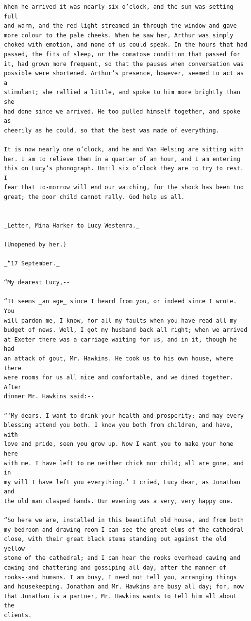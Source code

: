 \documentclass{article}
\begin{document}
\begin{verbatim}
When he arrived it was nearly six o’clock, and the sun was setting full
and warm, and the red light streamed in through the window and gave
more colour to the pale cheeks. When he saw her, Arthur was simply
choked with emotion, and none of us could speak. In the hours that had
passed, the fits of sleep, or the comatose condition that passed for
it, had grown more frequent, so that the pauses when conversation was
possible were shortened. Arthur’s presence, however, seemed to act as a
stimulant; she rallied a little, and spoke to him more brightly than she
had done since we arrived. He too pulled himself together, and spoke as
cheerily as he could, so that the best was made of everything.

It is now nearly one o’clock, and he and Van Helsing are sitting with
her. I am to relieve them in a quarter of an hour, and I am entering
this on Lucy’s phonograph. Until six o’clock they are to try to rest. I
fear that to-morrow will end our watching, for the shock has been too
great; the poor child cannot rally. God help us all.


_Letter, Mina Harker to Lucy Westenra._

(Unopened by her.)

_“17 September._

“My dearest Lucy,--

“It seems _an age_ since I heard from you, or indeed since I wrote. You
will pardon me, I know, for all my faults when you have read all my
budget of news. Well, I got my husband back all right; when we arrived
at Exeter there was a carriage waiting for us, and in it, though he had
an attack of gout, Mr. Hawkins. He took us to his own house, where there
were rooms for us all nice and comfortable, and we dined together. After
dinner Mr. Hawkins said:--

“‘My dears, I want to drink your health and prosperity; and may every
blessing attend you both. I know you both from children, and have, with
love and pride, seen you grow up. Now I want you to make your home here
with me. I have left to me neither chick nor child; all are gone, and in
my will I have left you everything.’ I cried, Lucy dear, as Jonathan and
the old man clasped hands. Our evening was a very, very happy one.

“So here we are, installed in this beautiful old house, and from both
my bedroom and drawing-room I can see the great elms of the cathedral
close, with their great black stems standing out against the old yellow
stone of the cathedral; and I can hear the rooks overhead cawing and
cawing and chattering and gossiping all day, after the manner of
rooks--and humans. I am busy, I need not tell you, arranging things
and housekeeping. Jonathan and Mr. Hawkins are busy all day; for, now
that Jonathan is a partner, Mr. Hawkins wants to tell him all about the
clients.


\end{verbatim}
\end{document}
